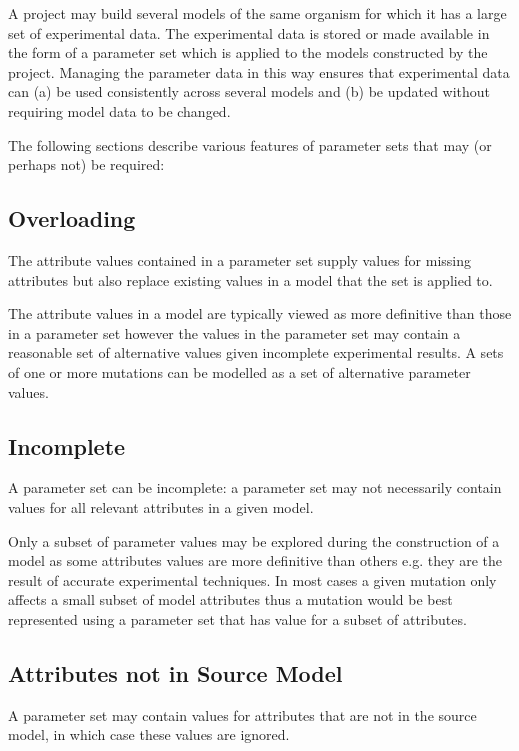 \documentclass[10pt,twocolumntoc]{cekarticle}
\begin{document}
A project may build several models of the same organism for which it has a large set of
experimental data.  The experimental data is stored or made available in the form of a parameter 
set which is applied to the models constructed by the project.  Managing the parameter data in
this way ensures that experimental data can (a) be used consistently across several models and
(b) be updated without requiring model data to be changed.

The following sections describe various features of parameter sets that may (or perhaps not) be
required:

\subsection{Overloading}

The attribute values contained in a parameter set supply values for missing attributes but also
replace existing values in a model that the set is applied to.

The attribute values in a model are typically viewed as more definitive than
those in a parameter set however the values in the parameter set may contain a reasonable set of
alternative values given incomplete experimental results.  A sets of one or more mutations
can be modelled as a set of alternative parameter values.

\subsection{Incomplete}

A parameter set can be incomplete: a parameter set may not necessarily contain values for all
relevant attributes in a given model.

Only a subset of parameter values may be explored during the construction of a model as some
attributes values are more definitive than others e.g. they are the result of accurate
experimental techniques.  In most cases a given mutation only affects
a small subset of model attributes thus a mutation would be best represented using a parameter
set that has value for a subset of attributes.

\subsection{Attributes not in Source Model}

A parameter set may contain values for attributes that are not in the source model, in which
case these values are ignored.
\end{document}
